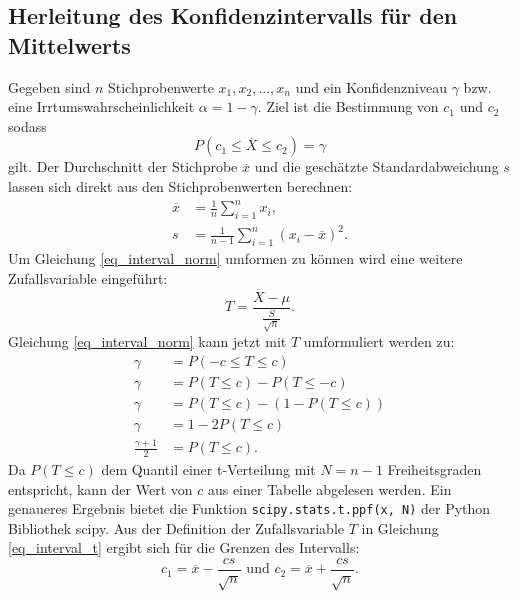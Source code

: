 \documentclass[10pt,twocolumn]{scrartcl}
\begin{document}
	\subsection{Herleitung des Konfidenzintervalls für den Mittelwerts }
		\label{chap_interval_mean_math}
		Gegeben sind $n$ Stichprobenwerte $x_1, x_2, ..., x_n$ und ein Konfidenzniveau $\gamma$ bzw. eine Irrtumswahrscheinlichkeit $\alpha = 1 - \gamma$.
		Ziel ist die Bestimmung von $c_1$ und $c_2$ sodass
		\begin{equation} \label{eq_interval_norm}
		P(c_1 \le \overline{X} \le c_2) = \gamma
		\end{equation}
		gilt.
		Der Durchschnitt der Stichprobe $\overline{x}$ und die geschätzte Standardabweichung $s$ lassen sich direkt aus den Stichprobenwerten berechnen:
		\begin{align}
		\overline{x} &=  \frac{1}{n} \sum_{i=1}^n{x_i} , \\
		s &= \frac{1}{n-1} \sum_{i=1}^n{(x_i - \overline{x})^2} .
		\end{align}
		Um Gleichung \ref{eq_interval_norm} umformen zu können wird eine weitere Zufallsvariable eingeführt:
		\begin{equation} \label{eq_interval_t}
		T = \frac{\overline{X} - \mu}{\frac{S}{\sqrt{n}}} .
		\end{equation}
		Gleichung \ref{eq_interval_norm} kann jetzt mit $T$ umformuliert werden zu:
		\begin{align}
		\gamma &= P(-c \le T \le c) \\ \nonumber
		\gamma &= P(T \le c) - P(T \le -c) \\ \nonumber
		\gamma &= P(T \le c) - (1 - P(T \le c)) \\ \nonumber
		\gamma &= 1 - 2 P(T \le c) \\
		\frac{\gamma + 1}{2} &= P(T \le c) .
		\end{align}
		Da $P(T \le c)$ dem Quantil einer t-Verteilung mit $N = n-1$ Freiheitsgraden entspricht, kann der Wert von $c$ aus einer Tabelle abgelesen werden. Ein genaueres Ergebnis bietet die Funktion \texttt{scipy.stats.t.ppf(x, N)} der Python Bibliothek scipy\cite{scipy}.
		Aus der Definition der Zufallsvariable $T$ in Gleichung \ref{eq_interval_t} ergibt sich für die Grenzen des Intervalls:
		\begin{equation}
		c_1 = \overline{x} - \frac{cs}{\sqrt{n}} \mbox{ und } c_2 = \overline{x} + \frac{cs}{\sqrt{n}}.
		\end{equation}
\end{document}
